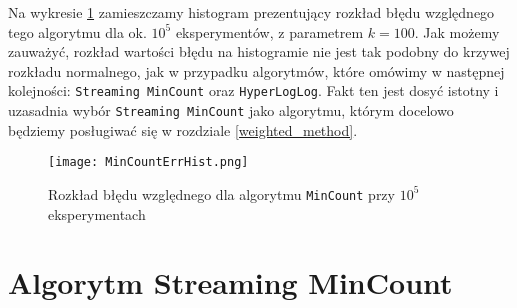 Na wykresie \ref{fig:mincount_hist} zamieszczamy histogram prezentujący rozkład błędu względnego tego algorytmu dla ok. $10^5$ eksperymentów, z parametrem $k=100$. Jak możemy zauważyć, rozkład wartości błędu na histogramie nie jest tak podobny do krzywej rozkładu normalnego, jak w przypadku algorytmów, które omówimy w następnej kolejności: \texttt{Streaming MinCount} oraz \texttt{HyperLogLog}. Fakt ten jest dosyć istotny i uzasadnia wybór \texttt{Streaming MinCount} jako algorytmu, którym docelowo będziemy posługiwać się w rozdziale \ref{weighted_method}.
\begin{figure}[h!]
	\texttt{[image: MinCountErrHist.png]}
	\centering
	\caption{Rozkład błędu względnego dla algorytmu \texttt{MinCount} przy $10^5$ eksperymentach}
	\label{fig:mincount_hist}
\end{figure}
\newpage

\section{Algorytm Streaming MinCount}
\label{smincount}

